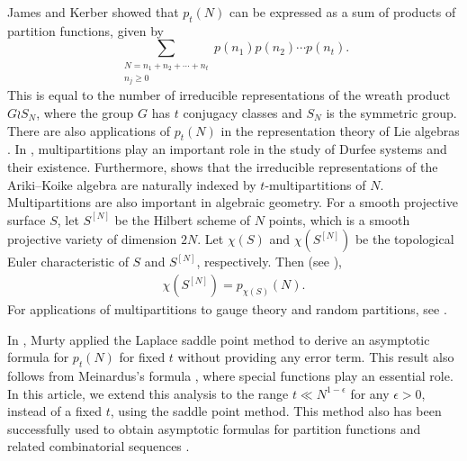 \documentclass[11pt]{amsart}
\theoremstyle{plain}
\numberwithin{equation}{section}
\begin{document}
	James and Kerber \cite[Corollary 4.4.4]{MR644144} showed that $p_t(N)$ can be expressed as a sum of products of partition functions, given by
	\begin{equation*}
		\sum_{\substack{N=n_{1}+n_{2}+\cdots+n_{t}\\ n_{j}\ge 0}} p(n_{1})p(n_{2})\cdots p(n_{t}).
	\end{equation*}
	This is equal to the number of irreducible representations of the wreath product $G \wr S_N$, where the group $G$ has $t$ conjugacy classes and $S_N$ is the symmetric group. There are also applications of $p_t(N)$ in the representation theory of Lie algebras \cite{bouwknegt2002,fayers2006weights}. In \cite{bouwknegt2002}, multipartitions play an important role in the study of Durfee systems and their existence. Furthermore, \cite{fayers2006weights} shows that the irreducible representations of the Ariki--Koike algebra are naturally indexed by $t$-multipartitions of $N$. Multipartitions are also important in algebraic geometry. For a smooth projective surface $S$, let $S^{[N]}$ be the Hilbert scheme of $N$ points, which is a smooth projective variety of dimension $2N.$ Let $\chi(S)$ and $\chi(S^{[N]})$ be the topological Euler characteristic of $S$ and $S^{[N]}$, respectively. Then (see \cite[equation $(2)$, Theorem 0.1]{gottsche}),
	\begin{align*}
		\chi\left(S^{[N]}\right)=p_{\chi(S)}(N).
	\end{align*}
	For applications of multipartitions to gauge theory and random partitions, see \cite{nekrasov}. 
	
	
	In \cite{murty2013partition}, Murty applied the Laplace saddle point method to derive an asymptotic formula for $p_t(N)$ for fixed $t$ without providing any error term. This result also follows from Meinardus's formula \cite{meinardus1953}, where special functions play an essential role. In this article, we extend this analysis to the range $t \ll N^{1-\epsilon}$ for any $\epsilon>0$, instead of a fixed $t$, using the saddle point method. This method also has been successfully used to obtain asymptotic formulas for partition functions and related combinatorial sequences \cite{barman2025lower, barman2026asymptotic, tyler2026asymptotics}. %
	
\end{document}
